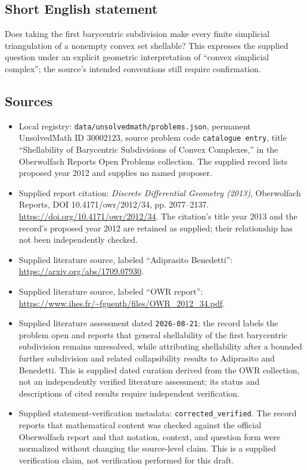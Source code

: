 \documentclass[11pt]{article}
\begin{document}
\subsection{Short English statement}
Does taking the first barycentric subdivision make every finite simplicial triangulation of a nonempty convex set shellable? This expresses the supplied question under an explicit geometric interpretation of ``convex simplicial complex''; the source's intended conventions still require confirmation.
\subsection{Sources}
\begin{itemize}
\item Local registry: \texttt{data/unsolvedmath/problems.json}, permanent UnsolvedMath ID \(30002123\), source problem code \texttt{catalogue entry}, title ``Shellability of Barycentric Subdivisions of Convex Complexes,'' in the Oberwolfach Reports Open Problems collection. The supplied record lists proposed year 2012 and supplies no named proposer.
\item Supplied report citation: \emph{Discrete Differential Geometry (2013)}, Oberwolfach Reports, DOI 10.4171/owr/2012/34, pp. 2077--2137. \url{https://doi.org/10.4171/owr/2012/34}. The citation's title year 2013 and the record's proposed year 2012 are retained as supplied; their relationship has not been independently checked.
\item Supplied literature source, labeled ``Adiprasito Benedetti'': \url{https://arxiv.org/abs/1709.07930}.
\item Supplied literature source, labeled ``OWR report'': \url{https://www.ihes.fr/~fguenth/files/OWR_2012_34.pdf}.
\item Supplied literature assessment dated \texttt{2026-08-21}: the record labels the problem open and reports that general shellability of the first barycentric subdivision remains unresolved, while attributing shellability after a bounded further subdivision and related collapsibility results to Adiprasito and Benedetti. This is supplied dated curation derived from the OWR collection, not an independently verified literature assessment; its status and descriptions of cited results require independent verification.
\item Supplied statement-verification metadata: \texttt{corrected\_verified}. The record reports that mathematical content was checked against the official Oberwolfach report and that notation, context, and question form were normalized without changing the source-level claim. This is a supplied verification claim, not verification performed for this draft.
\end{itemize}
\end{document}
